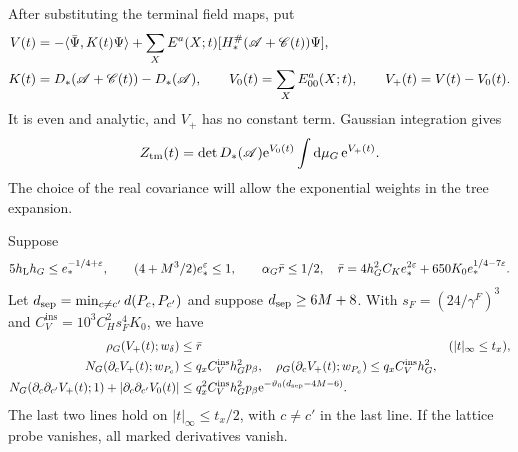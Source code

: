 \documentclass[11pt,letterpaper,reqno]{amsart}
\newcommand{\dd}{\mathrm d}
\begin{document}
After substituting the terminal field maps, put
\begin{align}
 V(t)&=-\langle\bar\Psi,K(t)\Psi\rangle
           +\sum_X E^a(X;t)[H_*^\#(\mathscr A+\mathscr C(t))\Psi],
                                                        \notag\\
 K(t)&=D_*(\mathscr A+\mathscr C(t))-D_*(\mathscr A),\qquad
 V_0(t)=\sum_XE^a_{00}(X;t),\qquad V_+(t)=V(t)-V_0(t).
                                    \label{eq:interacting-tree-interaction}
\end{align}
It is even and analytic, and $V_+$ has no
constant term. Gaussian integration gives
\begin{equation}\label{eq:interacting-real-Gaussian-factor}
 Z_{\rm tm}(t)=\det D_*(\mathscr A)\mathrm e^{V_0(t)}
                                  \int\dd\mu_G\,\mathrm e^{V_+(t)} .
\end{equation}
The choice of the real covariance will allow
the exponential weights in the tree expansion.

\begin{proposition}\label{prop:interacting-differentiated-norms}
Suppose
\begin{equation}\label{eq:interacting-tree-smallness}
 5h_{\rm L}h_G\le e_*^{-1/4+\varepsilon},\qquad
 (4+M^3/2)e_*^\varepsilon\le1,\qquad
 \alpha_G\bar r\le1/2,
 \quad
 \bar r=4h_G^2C_Ke_*^{2\varepsilon}
                            +650K_0e_*^{1/4-7\varepsilon}.
\end{equation}
Let $d_{\rm sep}=\min_{c\ne c'}d(P_c,P_{c'})$ and
suppose $d_{\rm sep}\ge6M+8$.
With
$s_F=(24/\gamma^F)^3$ and
$C_V^{\mathrm{ins}}=10^3C_H^2s_F^4K_0$, we have
\begin{align}
 \rho_G(V_+(t);w_\delta)&\le\bar r
                                      &&(|t|_\infty\le t_x),\notag\\
 N_G(\partial_cV_+(t);w_{P_c})&\le q_xC_V^{\mathrm{ins}}h_G^2p_\beta,
 \quad
 \rho_G(\partial_cV_+(t);w_{P_c})\le q_xC_V^{\mathrm{ins}}h_G^2,\notag\\
 N_G(\partial_c\partial_{c'}V_+(t);1)
          +|\partial_c\partial_{c'}V_0(t)|
 &\le q_x^2C_V^{\mathrm{ins}}h_G^2p_\beta
                    \mathrm e^{-\vartheta_0(d_{\rm sep}-4M-6)} .
                             \label{eq:interacting-differentiated-norms}
\end{align}
The last two lines hold on $|t|_\infty\le t_x/2$,
with $c\ne c'$ in the last line. If the lattice
probe vanishes, all marked derivatives vanish.
\end{proposition}
\end{document}
